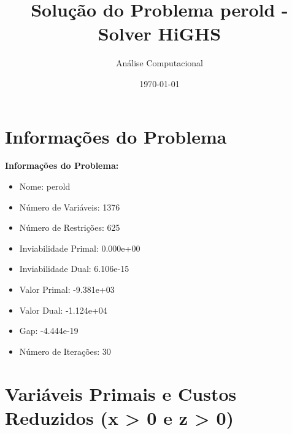 \documentclass[12pt]{article}
\title{Solução do Problema perold - Solver HiGHS}
\author{Análise Computacional}
\date{\today}
\begin{document}
\maketitle

\section{Informações do Problema}

\textbf{Informações do Problema:}
\begin{itemize}
\item Nome: perold
\item Número de Variáveis: 1376
\item Número de Restrições: 625
\item Inviabilidade Primal: 0.000e+00
\item Inviabilidade Dual: 6.106e-15
\item Valor Primal: -9.381e+03
\item Valor Dual: -1.124e+04
\item Gap: -4.444e-19
\item Número de Iterações: 30
\end{itemize}


\section{Variáveis Primais e Custos Reduzidos (x > 0 e z > 0)}
\end{document}
